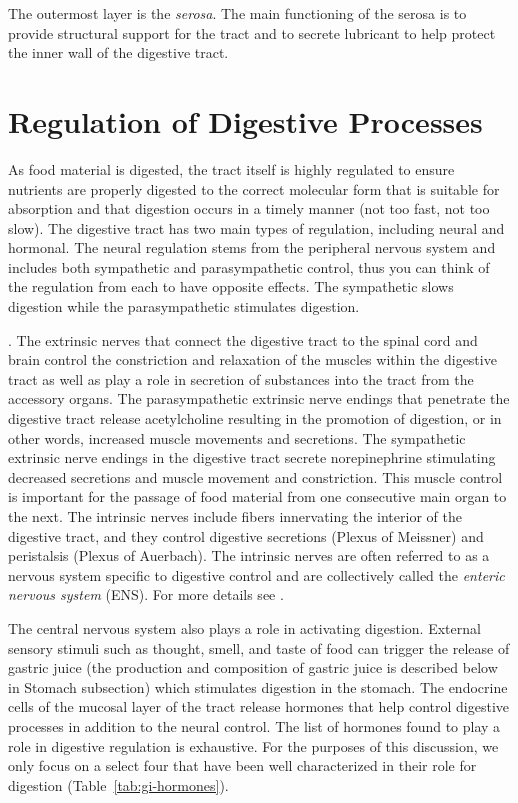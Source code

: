 \documentclass{tufte-handout}
\begin{document}
The outermost layer is the \emph{serosa}. The main functioning of the serosa is to provide structural support for the tract and to secrete lubricant to help protect the inner wall of the digestive tract.

\section{Regulation of Digestive Processes}
As food material is digested, the tract itself is highly regulated to ensure nutrients are properly digested to the correct molecular form that is suitable for absorption and that digestion occurs in a timely manner (not too fast, not too slow). The digestive tract has two main types of regulation, including neural and hormonal. The neural regulation stems from the peripheral nervous system and includes both sympathetic and parasympathetic control, thus you can think of the regulation from each to have opposite effects. The sympathetic slows digestion while the parasympathetic stimulates digestion. 

. The extrinsic nerves that connect the digestive tract to the spinal cord and brain control the constriction and relaxation of the muscles within the digestive tract as well as play a role in secretion of substances into the tract from the accessory organs. The parasympathetic extrinsic nerve endings that penetrate the digestive tract release acetylcholine resulting in the promotion of digestion, or in other words, increased muscle movements and secretions. The sympathetic extrinsic nerve endings in the digestive tract secrete norepinephrine stimulating decreased secretions and muscle movement and constriction. This muscle control is important for the passage of food material from one consecutive main organ to the next. The intrinsic nerves include fibers innervating the interior of the digestive tract, and they control digestive secretions (Plexus of Meissner) and peristalsis (Plexus of Auerbach). The intrinsic nerves are often referred to as a nervous system specific to digestive control and are collectively called the \emph{enteric nervous system} (ENS).  For more details see \citet{Furness2012}.

The central nervous system also plays a role in activating digestion. External sensory stimuli such as thought, smell, and taste of food can trigger the release of gastric juice (the production and composition of gastric juice is described below in Stomach subsection) which stimulates digestion in the stomach. The endocrine cells of the mucosal layer of the tract release hormones that help control digestive processes in addition to the neural control. The  list of hormones found to play a role in digestive regulation is exhaustive. For the purposes of this discussion, we only focus on a select four that have been well characterized in their role for digestion (Table~\ref{tab:gi-hormones}). 
\end{document}
